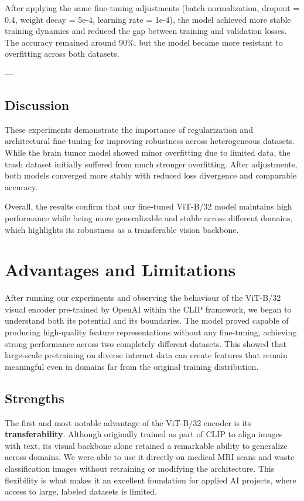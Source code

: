 \documentclass[12pt]{article}
\begin{document}
After applying the same fine-tuning adjustments (batch normalization, dropout = 0.4, weight decay = 5e-4, learning rate = 1e-4), 
the model achieved more stable training dynamics and reduced the gap between training and validation losses. 
The accuracy remained around 90\%, but the model became more resistant to overfitting across both datasets.

---

\subsection{Discussion}

These experiments demonstrate the importance of regularization and architectural fine-tuning for improving robustness across heterogeneous datasets. 
While the brain tumor model showed minor overfitting due to limited data, 
the trash dataset initially suffered from much stronger overfitting. 
After adjustments, both models converged more stably with reduced loss divergence and comparable accuracy.

Overall, the results confirm that our fine-tuned ViT-B/32 model maintains high performance 
while being more generalizable and stable across different domains, 
which highlights its robustness as a transferable vision backbone.



\section{Advantages and Limitations}

After running our experiments and observing the behaviour of the ViT-B/32 visual encoder pre-trained by OpenAI within the CLIP framework, we began to understand both its potential and its boundaries. The model proved capable of producing high-quality feature representations without any fine-tuning, achieving strong performance across two completely different datasets. This showed that large-scale pretraining on diverse internet data can create features that remain meaningful even in domains far from the original training distribution.

\subsection{Strengths}
The first and most notable advantage of the ViT-B/32 encoder is its \textbf{transferability}. Although originally trained as part of CLIP to align images with text, its visual backbone alone retained a remarkable ability to generalize across domains. We were able to use it directly on medical MRI scans and waste classification images without retraining or modifying the architecture. This flexibility is what makes it an excellent foundation for applied AI projects, where access to large, labeled datasets is limited.
\end{document}
